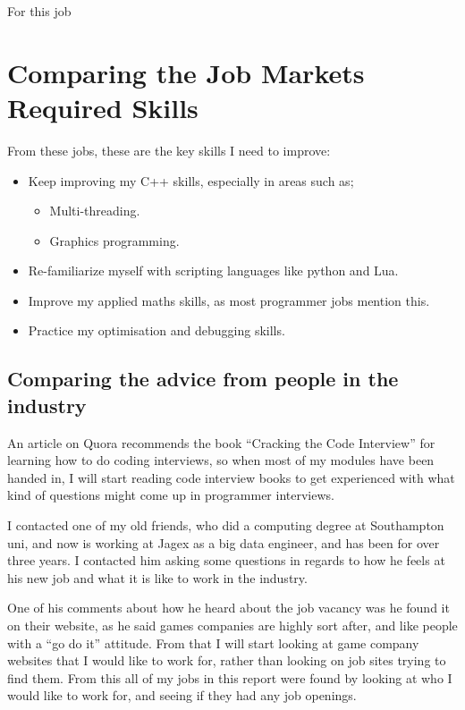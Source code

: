 \documentclass{scrartcl}
\begin{document}
For this job 







\section{Comparing the Job Markets Required Skills}
From these jobs, these are the key skills I need to improve:

\begin{itemize}
	\item Keep improving my C++ skills, especially in areas such as;
		\begin{itemize}
			\item Multi-threading.
			\item Graphics programming.
		\end{itemize}
	\item Re-familiarize myself with scripting languages like python and Lua.
	\item Improve my applied maths skills, as most programmer jobs mention this. 
	\item Practice my optimisation and debugging skills.
\end{itemize}





\subsection{Comparing the advice from people in the industry}
An article on Quora \cite{codeBookreview} recommends the book ``Cracking the Code Interview'' for learning how to do coding interviews, so when most of my modules have been handed in, I will start reading code interview books to get experienced with what kind of questions might come up in programmer interviews.

I contacted one of my old friends, who did a computing degree at Southampton uni, and now is working at Jagex as a big data engineer, and has been for over three years. 
I contacted him asking some questions in regards to how he feels at his new job and what it is like to work in the industry.

One of his comments about how he heard about the job vacancy was he found it on their website, as he said games companies are highly sort after, and like people with a ``go do it'' attitude.
From that I will start looking at game company websites that I would like to work for, rather than looking on job sites trying to find them. From this all of my jobs in this report were found by looking at who I would like to work for, and seeing if they had any job openings.
\end{document}
